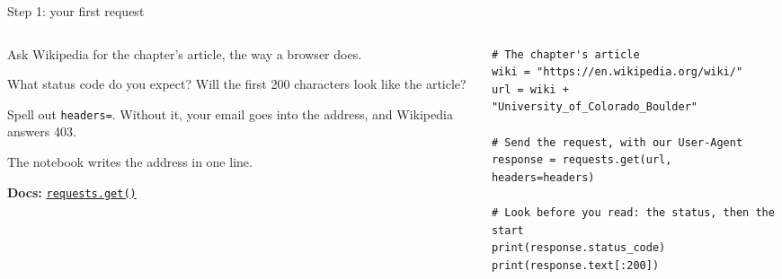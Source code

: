 \documentclass[9pt,aspectratio=169]{beamer}
\begin{document}
\begin{frame}[fragile]{Step 1: your first request}
    \begin{columns}[T]
        \begin{column}{0.37\textwidth}
            Ask Wikipedia for the chapter's article, the way a browser does.

            \medskip
            What status code do you expect? Will the first 200 characters look like the article?

            \medskip
            Spell out \texttt{headers=}. Without it, your email goes into the address, and Wikipedia answers 403.

            \medskip
            The notebook writes the address in one line.

            \medskip
            {\scriptsize\textbf{Docs:} \href{https://requests.readthedocs.io/en/stable/user/quickstart/\#make-a-request}{\texttt{requests.get()}}\par}
        \end{column}
        \begin{column}{0.6\textwidth}
\begin{lstlisting}
# The chapter's article
wiki = "https://en.wikipedia.org/wiki/"
url = wiki + "University_of_Colorado_Boulder"

# Send the request, with our User-Agent
response = requests.get(url, headers=headers)

# Look before you read: the status, then the start
print(response.status_code)
print(response.text[:200])
\end{lstlisting}
        \end{column}
    \end{columns}
\end{frame}
\end{document}
